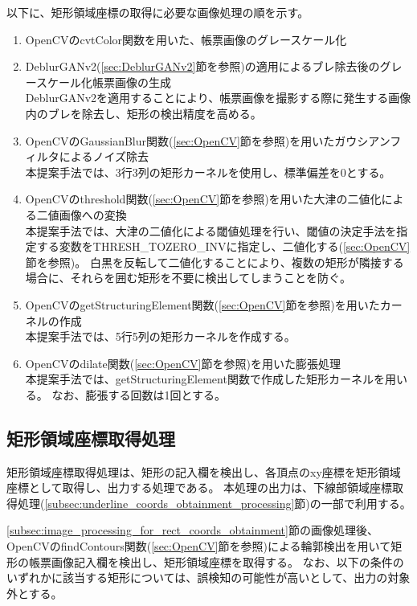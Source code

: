 以下に、矩形領域座標の取得に必要な画像処理の順を示す。

\begin{enumerate}
    \item OpenCVのcvtColor関数を用いた、帳票画像のグレースケール化
    \item DeblurGANv2(\ref{sec:DeblurGANv2}節を参照)の適用によるブレ除去後のグレースケール化帳票画像の生成\\
        DeblurGANv2を適用することにより、帳票画像を撮影する際に発生する画像内のブレを除去し、矩形の検出精度を高める。
    \item OpenCVのGaussianBlur関数(\ref{sec:OpenCV}節を参照)を用いたガウシアンフィルタによるノイズ除去\\
        本提案手法では、3行3列の矩形カーネルを使用し、標準偏差を0とする。
    \item OpenCVのthreshold関数(\ref{sec:OpenCV}節を参照)を用いた大津の二値化による二値画像への変換\\
        本提案手法では、大津の二値化による閾値処理を行い、閾値の決定手法を指定する変数をTHRESH\_TOZERO\_INVに指定し、二値化する(\ref{sec:OpenCV}節を参照)。
        白黒を反転して二値化することにより、複数の矩形が隣接する場合に、それらを囲む矩形を不要に検出してしまうことを防ぐ。
    \item OpenCVのgetStructuringElement関数(\ref{sec:OpenCV}節を参照)を用いたカーネルの作成\\
        本提案手法では、5行5列の矩形カーネルを作成する。
    \item OpenCVのdilate関数(\ref{sec:OpenCV}節を参照)を用いた膨張処理\\
        本提案手法では、getStructuringElement関数で作成した矩形カーネルを用いる。
        なお、膨張する回数は1回とする。
\end{enumerate}


\subsection{矩形領域座標取得処理}\label{subsec:rect_coords_obtainment_processing}
矩形領域座標取得処理は、矩形の記入欄を検出し、各頂点のxy座標を矩形領域座標として取得し、出力する処理である。
本処理の出力は、下線部領域座標取得処理(\ref{subsec:underline_coords_obtainment_processing}節)の一部で利用する。

\ref{subsec:image_processing_for_rect_coords_obtainment}節の画像処理後、OpenCVのfindContours関数(\ref{sec:OpenCV}節を参照)による輪郭検出を用いて矩形の帳票画像記入欄を検出し、矩形領域座標を取得する。
なお、以下の条件のいずれかに該当する矩形については、誤検知の可能性が高いとして、出力の対象外とする。

